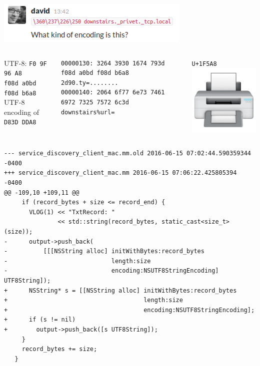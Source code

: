 \documentclass[aspectratio=169]{beamer}
\begin{document}
\begin{frame}[fragile]
  \begin{center}
    \includegraphics[scale=0.5]{what-kind-of-encoding-is-this}
  \end{center}
  \begin{columns}[t]
    \centering
    UTF-8: \verb?F0 9F 96 A8? \\
    \verb?f08d a0bd f08d b6a8? \\
    UTF-8 encoding of \verb?D83D DDA8?
    \vspace*{5em}
    \begin{verbatim}
00000130: 3264 3930 1674 793d f08d a0bd f08d b6a8  2d90.ty=........
00000140: 2064 6f77 6e73 7461 6972 7325 7572 6c3d   downstairs%url=
    \end{verbatim}
    \centering
    \verb?U+1F5A8? \\
    \includegraphics[scale=0.3]{printer-emoji}
  \end{columns}
\end{frame}

\begin{frame}[fragile]
  \begin{verbatim}
--- service_discovery_client_mac.mm.old	2016-06-15 07:02:44.590359344 -0400
+++ service_discovery_client_mac.mm	2016-06-15 07:06:22.425805394 -0400
@@ -109,10 +109,11 @@
     if (record_bytes + size <= record_end) {
       VLOG(1) << "TxtRecord: "
               << std::string(record_bytes, static_cast<size_t>(size));
-      output->push_back(
-          [[[NSString alloc] initWithBytes:record_bytes
-                             length:size
-                             encoding:NSUTF8StringEncoding] UTF8String]);
+      NSString* s = [[NSString alloc] initWithBytes:record_bytes
+                                      length:size
+                                      encoding:NSUTF8StringEncoding];
+      if (s != nil)
+        output->push_back([s UTF8String]);
     }
     record_bytes += size;
   }
  \end{verbatim}
\end{frame}
\end{document}
